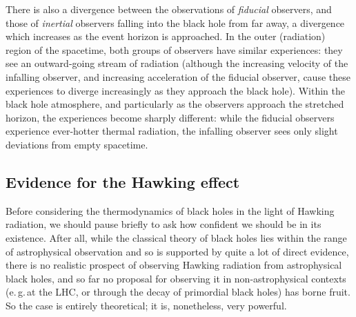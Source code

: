 \documentclass[12pt]{article}
\newcommand{\egc}{\mbox{e.\,g.\,}}
\begin{document}
 There is also a divergence between the observations of \emph{fiducial} observers, and those of \emph{inertial} observers falling into the black hole from far away, a divergence which increases as the event horizon is approached. In the outer (radiation) region of the spacetime, both groups of observers have similar experiences: they see an outward-going stream of radiation (although the increasing velocity of the infalling observer, and increasing acceleration of the fiducial observer, cause these experiences to diverge increasingly as they approach the black hole). Within the black hole atmosphere, and particularly as the observers approach the stretched horizon, the experiences become sharply different: while the fiducial observers experience ever-hotter thermal radiation, the infalling observer sees only slight  deviations from empty spacetime.
 
 \subsection{Evidence for the Hawking effect}
 
 Before considering the thermodynamics of black holes in the light of Hawking radiation, we should pause briefly to ask how confident we should be in its existence. After all, while the classical theory of black holes lies within the range of astrophysical observation and so is supported by quite a lot of direct evidence, there is no realistic prospect of observing Hawking radiation from astrophysical black holes, and so far no proposal for observing it in non-astrophysical contexts (\egc at the LHC, or through the decay of primordial black holes) has borne fruit. So the case is entirely theoretical; it is, nonetheless, very powerful.
 
\end{document}
